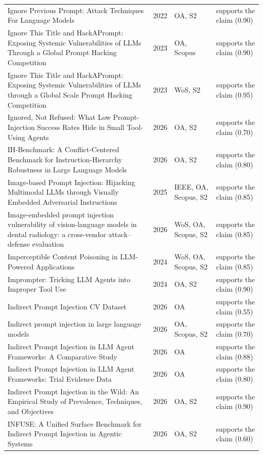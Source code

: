 \begin{longtable}{@{}%
  >{\raggedright\arraybackslash}p{}c%
  >{\raggedright\arraybackslash}p{}%
  >{\raggedright\arraybackslash}p{}@{}}
Ignore Previous Prompt: Attack Techniques For Language Models & 2022 & OA, S2 & supports the claim (0.90) \\
Ignore This Title and HackAPrompt: Exposing Systemic Vulnerabilities of LLMs Through a Global Prompt Hacking Competition & 2023 & OA, Scopus & supports the claim (0.90) \\
Ignore This Title and HackAPrompt: Exposing Systemic Vulnerabilities of LLMs through a Global Scale Prompt Hacking Competition & 2023 & WoS, S2 & supports the claim (0.95) \\
Ignored, Not Refused: What Low Prompt-Injection Success Rates Hide in Small Tool-Using Agents & 2026 & OA, S2 & supports the claim (0.70) \\
IH-Benchmark: A Conflict-Centered Benchmark for Instruction-Hierarchy Robustness in Large Language Models & 2026 & OA, S2 & supports the claim (0.80) \\
Image-based Prompt Injection: Hijacking Multimodal LLMs through Visually Embedded Adversarial Instructions & 2025 & IEEE, OA, Scopus, S2 & supports the claim (0.85) \\
Image-embedded prompt injection vulnerability of vision-language models in dental radiology: a cross-vendor attack--defense evaluation & 2026 & WoS, OA, Scopus, S2 & supports the claim (0.85) \\
Imperceptible Content Poisoning in LLM-Powered Applications & 2024 & WoS, OA, Scopus, S2 & supports the claim (0.85) \\
Imprompter: Tricking LLM Agents into Improper Tool Use & 2024 & OA, S2 & supports the claim (0.90) \\
Indirect Prompt Injection CV Dataset & 2026 & OA & supports the claim (0.55) \\
Indirect prompt injection in large language models & 2026 & OA, Scopus, S2 & supports the claim (0.70) \\
Indirect Prompt Injection in LLM Agent Frameworks: A Comparative Study & 2026 & OA & supports the claim (0.88) \\
Indirect Prompt Injection in LLM Agent Frameworks: Trial Evidence Data & 2026 & OA & supports the claim (0.80) \\
Indirect Prompt Injection in the Wild: An Empirical Study of Prevalence, Techniques, and Objectives & 2026 & OA, S2 & supports the claim (0.90) \\
INFUSE: A Unified Surface Benchmark for Indirect Prompt Injection in Agentic Systems & 2026 & OA, S2 & supports the claim (0.60) \\

\end{longtable}
